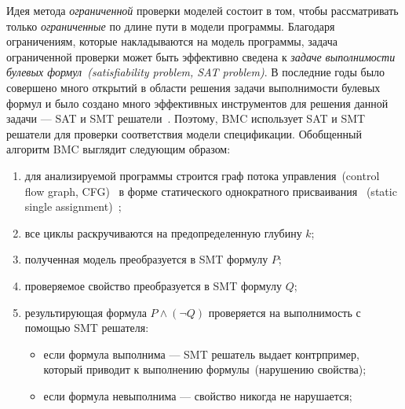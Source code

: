 Идея метода \emph{ограниченной} проверки моделей состоит в том, чтобы 
рассматривать только \emph{ограниченные} по длине пути в модели программы.
Благодаря ограничениям, которые накладываются на модель программы, задача
ограниченной проверки может быть эффективно сведена к \emph{задаче 
выполнимости булевых формул~(satisfiability problem, SAT problem)}. В 
последние годы было совершено много открытий в области решения задачи 
выполнимости булевых формул и было создано много эффективных инструментов для
решения данной задачи --- SAT и SMT решатели~\cite{sat, smt}. Поэтому, BMC 
использует SAT и SMT решатели для проверки соответствия модели спецификации.
Обобщенный алгоритм BMC выглядит следующим образом:
\begin{enumerate}
\item для анализируемой программы строится граф потока управления~(control
flow graph, CFG)~\cite{cfg} в форме статического однократного присваивания
~(static single assignment)~\cite{ssa};

\item все циклы раскручиваются на предопределенную глубину $k$;

\item полученная модель преобразуется в SMT формулу $P$;

\item проверяемое свойство преобразуется в SMT формулу $Q$;

\item результирующая формула $P \land (\neg Q)$ проверяется на выполнимость с
помощью SMT решателя:
	\begin{itemize}
	\item если формула выполнима --- SMT решатель выдает контрпример, который 
	приводит к выполнению формулы~(нарушению свойства);
	\item если формула невыполнима --- свойство никогда не нарушается;
	\end{itemize}
\end{enumerate}

